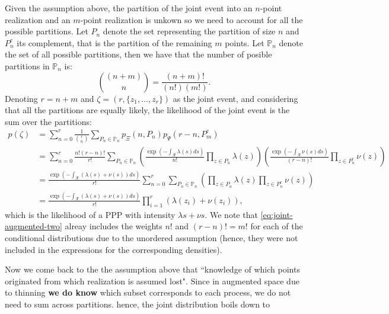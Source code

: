 \documentclass{article}
\newcommand{\calR}{\mathcal{R}}
\newcommand{\ls}{\lambda(s)}
\newcommand{\ns}{\nu(s)}
\newcommand{\bbP}{\mathbb{P}}
\begin{document}
	Given the assumption above, the partition of the joint event into an $n$-point realization and an $m$-point realization is unkown so we need to account for all the possible partitions. Let $P_n$ denote the set representing the partition of size $n$ and $P_n^c$ its complement, that is the partition of the remaining $m$ points. Let $\bbP_n$ denote the set of all possible partitions, then we have that the number of posible partitions in $\bbP_n$ is: 
	\begin{equation}
		 {(n+m) \choose n} = \frac{(n+m)!}{(n!) (m!)}  \text{.}
	\end{equation}
	Denoting $r=n + m$ and $\zeta = (r, \{z_1, \ldots, z_r\})$ as the joint event, and considering that all the partitions are equally likely,  the likelihood of the joint event is the sum over the partitions:
	\begin{align}
		p(\zeta) &= \sum_{n=0}^r \frac{1}{{r \choose n }} \sum_{P_n \in \bbP_n} p_{\Xi}(n, P_n)  p_{\Psi}(r-n, P_m^c ) \\
		&= \sum_{n=0}^r  \frac{n! (r-n)!}{r!} \sum_{P_n \in \bbP_n} 
		\label{eq:joint-augmented-two}
		\left( \frac{ \exp\left(-\int_{\calR} \ls ds\right) }{n!} \prod_{z \in P_n} \lambda(z) \right)
		\left(  \frac{ \exp\left(-\int_{\calR} \ns ds\right) }{(r-n)!}  \prod_{z \in P_n^c} \nu(z) \right) \\
		&= \frac{ \exp\left(-\int_{\calR} (\ls + \ns) ds\right) }{r!}  \sum_{n=0}^r  \sum_{P_n \in \bbP_n} \left(  \prod_{z \in P_n} \lambda(z)    \prod_{z \in P_n^c} \nu(z) \right)\\
		& =  \frac{ \exp\left(-\int_{\calR} (\ls + \ns) ds\right) }{r!}   \prod_{i=1}^r (  \lambda(z_i) + \nu(z_i) ) \text{,}
	\end{align}
	which is the likelihood of a \gls{PPP} with intensity $\lambda{s} + \nu{s}$.  We note that \cref{eq:joint-augmented-two} alreay includes the weights $n!$ and $(r-n)! = m!$ for each of the conditional distributions due to the unordered assumption (hence, they were not included in the expressions for the corresponding densities). 
	 
	 Now we come back to the the assumption above that ``knowledge of which points originated from which realization is assumed lost". Since in augmented space due to thinning \textbf{we do know} which subset corresponds to each process, we do not need to sum across partitions. hence, the joint distribution boils down to 
	 
	 
	  
\end{document}
